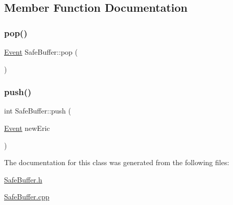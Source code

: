 \subsection{Member Function Documentation}
\mbox{\label{class_safe_buffer_a90a33fca4d838f7c0eef6e8557f3c281}} 
\subsubsection{\texorpdfstring{pop()}{pop()}}
{\footnotesize\ttfamily \hyperlink{class_event}{Event} Safe\+Buffer\+::pop (\begin{DoxyParamCaption}{ }\end{DoxyParamCaption})}

\mbox{\label{class_safe_buffer_ac3ed0799ec2e84c97e36b22c83f7abf5}} 
\subsubsection{\texorpdfstring{push()}{push()}}
{\footnotesize\ttfamily int Safe\+Buffer\+::push (\begin{DoxyParamCaption}\item[{\hyperlink{class_event}{Event}}]{new\+Eric }\end{DoxyParamCaption})}



The documentation for this class was generated from the following files\+:\begin{DoxyCompactItemize}
\item 
\hyperlink{_safe_buffer_8h}{Safe\+Buffer.\+h}\item 
\hyperlink{_safe_buffer_8cpp}{Safe\+Buffer.\+cpp}\end{DoxyCompactItemize}
